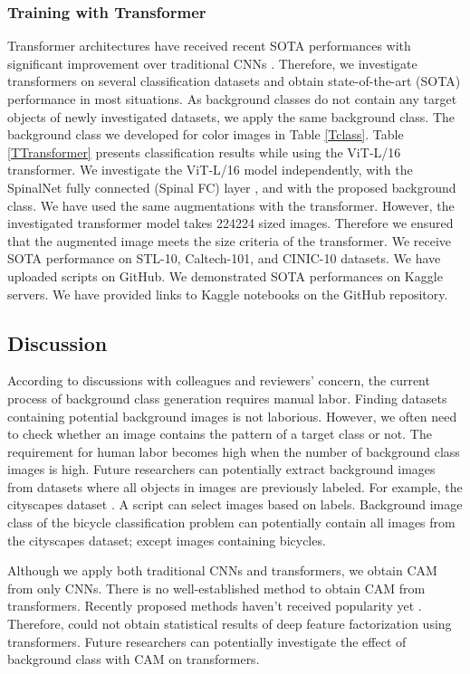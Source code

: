 \documentclass{article}
\begin{document}
\subsubsection{Training with Transformer}
Transformer architectures have received recent SOTA performances with significant improvement over traditional CNNs \cite{ranftl2021vision, fan2021multiscale}. Therefore, we investigate transformers on several classification datasets and obtain state-of-the-art (SOTA) performance in most situations. As background classes do not contain any target objects of newly investigated datasets, we apply the same background class. The background class we developed for color images in Table \ref{Tclass}. Table \ref{TTransformer} presents classification results while using the ViT‑L/16 transformer. We investigate the ViT‑L/16 model independently, with the SpinalNet fully connected (Spinal FC) layer \cite{kabir2022spinalnet}, and with the proposed background class. 
We have used the same augmentations with the transformer. However, the investigated transformer model takes 224224 sized images. Therefore we ensured that the augmented image meets the size criteria of the transformer. 
We receive SOTA performance on STL-10, Caltech-101, and CINIC-10 datasets. We have uploaded scripts on GitHub. We demonstrated SOTA performances on Kaggle servers. We have provided links to Kaggle notebooks on the GitHub repository.



\subsection{Discussion}
According to discussions with colleagues and reviewers' concern, the current process of background class generation requires manual labor. Finding datasets containing potential background images is not laborious. However, we often need to check whether an image contains the pattern of a target class or not. The requirement for human labor becomes high when the number of background class images is high. Future researchers can potentially extract background images from datasets where all objects in images are previously labeled. For example, the cityscapes dataset \cite{cordts2016cityscapes}. A script can select images based on labels. Background image class of the bicycle classification problem can potentially contain all images from the cityscapes dataset; except images containing bicycles. 

Although we apply both traditional CNNs and transformers, we obtain CAM from only CNNs. There is no well-established method to obtain CAM from transformers. Recently proposed methods haven't received popularity yet \cite{li2023transcam, qiang2022attcat}. Therefore, could not obtain statistical results of deep feature factorization using transformers. Future researchers can potentially investigate the effect of background class with CAM on transformers.
\end{document}
